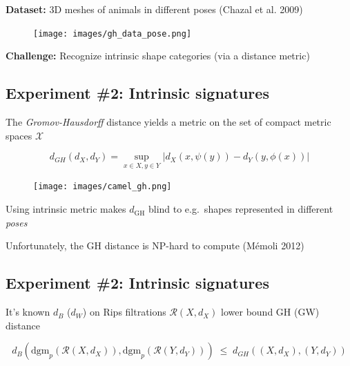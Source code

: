 \documentclass[
  letterpaper,
  DIV=11,
  numbers=noendperiod,
  oneside]{scrartcl}
\begin{document}
\textbf{Dataset:} 3D meshes of animals in different poses (Chazal et al.
2009)

\begin{figure}

{\centering \texttt{[image: images/gh\_data\_pose.png]}

}

\end{figure}

\textbf{Challenge:} Recognize intrinsic shape categories (via a distance
metric)

\subsection{Experiment \#2: Intrinsic
signatures}\label{experiment-2-intrinsic-signatures-1}

The \emph{Gromov-Hausdorff} distance yields a metric on the set of
compact metric spaces \(\mathcal{X}\)

\[
d_{GH}(d_X, d_Y) = \sup_{x \in X, y \in Y} \lvert d_X(x, \psi(y)) - d_Y(y, \phi(x))\rvert 
\]

\begin{figure}

{\centering \texttt{[image: images/camel\_gh.png]}

}

\end{figure}

Using intrinsic metric makes \(d_{\mathrm{GH}}\) blind to e.g.~shapes
represented in different \emph{poses}

Unfortunately, the GH distance is NP-hard to compute (Mémoli 2012)

\subsection{Experiment \#2: Intrinsic
signatures}\label{experiment-2-intrinsic-signatures-2}

It's known \(d_B\) (\(d_W\)) on Rips filtrations \(\mathcal{R}(X, d_X)\)
lower bound GH (GW) distance

\[ 
d_B(\mathrm{dgm}_p(\mathcal{R}(X, d_X)), \mathrm{dgm}_p(\mathcal{R}(Y, d_Y))) \; \leq \; d_{GH}((X, d_X), (Y, d_Y))
\]

\begin{figure}

\begin{minipage}[t]{\linewidth}

{\centering 


}

\end{minipage}%

\end{figure}
\end{document}
